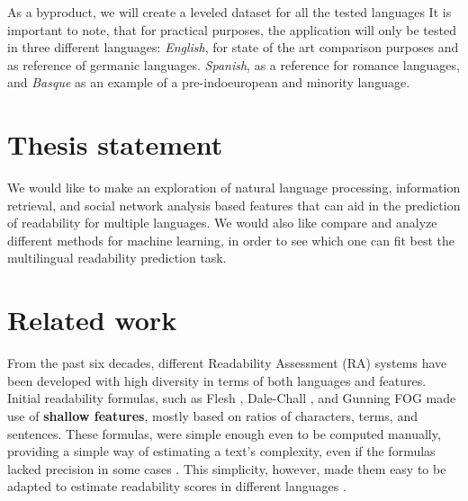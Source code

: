 \documentclass[12pt]{article}
\begin{document}
As a byproduct, we will create a leveled dataset for all the tested languages
It is important to note, that for practical purposes, the application will only be tested in three different languages: \textit{English}, for state of the art comparison purposes and as reference of germanic languages. \textit{Spanish}, as a reference for romance languages, and \textit{Basque} as an example of a pre-indoeuropean and minority language.



\section{Thesis statement}

We would like to make an exploration of natural language processing, information retrieval, and social network analysis based features that can aid in the prediction of readability for multiple languages. We would also like compare and analyze different methods for machine learning, in order to see which one can fit best the multilingual readability prediction task.





\section{Related work}
From the past six decades, different Readability Assessment (RA) systems have been developed with high diversity in terms of both languages and features. Initial readability formulas, such as Flesh \cite{flesch1948new}, Dale-Chall \cite{chall1995readability}, and Gunning FOG \cite{albright1996readability} made use of \textbf{shallow features}, mostly based on ratios of characters, terms, and sentences. These formulas, were simple enough even to be computed manually, providing a simple way of estimating a text's complexity, even if the formulas lacked precision in some cases \cite{davison1982failure}. This simplicity, however, made them easy to be adapted to estimate readability scores in different languages \cite{spaulding1956spanish}.
\end{document}
